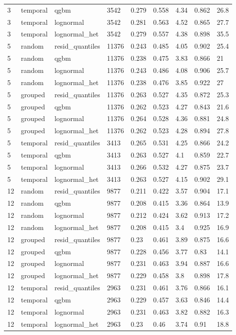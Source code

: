 \begin{tabular}{lllllllll}
3 & temporal & qgbm & 3542 & 0.279 & 0.558 & 4.34 & 0.862 & 26.8 \\
3 & temporal & lognormal & 3542 & 0.281 & 0.563 & 4.52 & 0.865 & 27.7 \\
3 & temporal & lognormal\_het & 3542 & 0.279 & 0.557 & 4.38 & 0.898 & 35.5 \\
5 & random & resid\_quantiles & 11376 & 0.243 & 0.485 & 4.05 & 0.902 & 25.4 \\
5 & random & qgbm & 11376 & 0.238 & 0.475 & 3.83 & 0.866 & 21 \\
5 & random & lognormal & 11376 & 0.243 & 0.486 & 4.08 & 0.906 & 25.7 \\
5 & random & lognormal\_het & 11376 & 0.238 & 0.476 & 3.85 & 0.922 & 27 \\
5 & grouped & resid\_quantiles & 11376 & 0.263 & 0.527 & 4.35 & 0.872 & 25.3 \\
5 & grouped & qgbm & 11376 & 0.262 & 0.523 & 4.27 & 0.843 & 21.6 \\
5 & grouped & lognormal & 11376 & 0.264 & 0.528 & 4.36 & 0.881 & 24.8 \\
5 & grouped & lognormal\_het & 11376 & 0.262 & 0.523 & 4.28 & 0.894 & 27.8 \\
5 & temporal & resid\_quantiles & 3413 & 0.265 & 0.531 & 4.25 & 0.866 & 24.2 \\
5 & temporal & qgbm & 3413 & 0.263 & 0.527 & 4.1 & 0.859 & 22.7 \\
5 & temporal & lognormal & 3413 & 0.266 & 0.532 & 4.27 & 0.875 & 23.7 \\
5 & temporal & lognormal\_het & 3413 & 0.263 & 0.527 & 4.15 & 0.902 & 29.1 \\
12 & random & resid\_quantiles & 9877 & 0.211 & 0.422 & 3.57 & 0.904 & 17.1 \\
12 & random & qgbm & 9877 & 0.208 & 0.415 & 3.36 & 0.864 & 13.9 \\
12 & random & lognormal & 9877 & 0.212 & 0.424 & 3.62 & 0.913 & 17.2 \\
12 & random & lognormal\_het & 9877 & 0.208 & 0.415 & 3.4 & 0.925 & 16.9 \\
12 & grouped & resid\_quantiles & 9877 & 0.23 & 0.461 & 3.89 & 0.875 & 16.6 \\
12 & grouped & qgbm & 9877 & 0.228 & 0.456 & 3.77 & 0.83 & 14.1 \\
12 & grouped & lognormal & 9877 & 0.231 & 0.463 & 3.94 & 0.887 & 16.6 \\
12 & grouped & lognormal\_het & 9877 & 0.229 & 0.458 & 3.8 & 0.898 & 17.8 \\
12 & temporal & resid\_quantiles & 2963 & 0.231 & 0.461 & 3.76 & 0.866 & 16.1 \\
12 & temporal & qgbm & 2963 & 0.229 & 0.457 & 3.63 & 0.846 & 14.4 \\
12 & temporal & lognormal & 2963 & 0.231 & 0.463 & 3.82 & 0.882 & 16.3 \\
12 & temporal & lognormal\_het & 2963 & 0.23 & 0.46 & 3.74 & 0.91 & 18.8 \\
\bottomrule
\end{tabular}